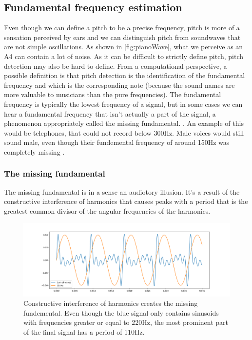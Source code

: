% 
\subsection{Fundamental frequency estimation}
Even though we can define a pitch to be a precise frequency, pitch is more of a sensation perceived by ears and we can distinguish pitch from soundwaves that are not simple oscillations. As shown in \ref{fig:pianoWave}, what we perceive as an A4 can contain a lot of noise.  As it can be difficult to strictly define pitch, pitch detection may also be hard to define. From a computational perspective, a possible definition is that pitch detection is the identification of the fundamental frequency and which is the corresponding note (because the sound names are more valuable to musicians than the pure frequencies). The fundamental frequency is typically the lowest frequency of a signal, but in some cases we can hear a fundamental frequency that isn't actually a part of the signal, a phenomenon appropriately called the missing fundamental. . An example of this would be telephones, that could not record below 300Hz. Male voices would still sound male, even though their fundemental frequency of around 150Hz was completely missing .

\subsubsection{The missing fundamental}
The missing fundamental is in a sense an audiotory illusion. It's a result of the constructive interference of harmonics that causes peaks with a period that is the greatest common divisor of the angular frequencies of the harmonics. 

\begin{figure}[ht]
    \centering
    \includegraphics[width=\textwidth]{./images/missingfund.png}
    \caption{Constructive interference of harmonics creates the missing fundemental. Even though the blue signal only contains sinusoids with frequencies greater or equal to 220Hz, the most prominent part of the final signal has a period of 110Hz. \label{fig:missingfund}}
\end{figure}

